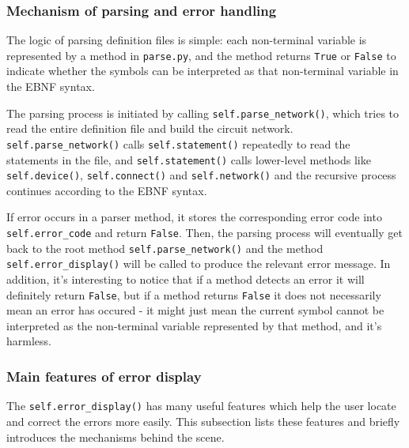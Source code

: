 \documentclass[10pt,a4paper]{article}
\begin{document}
\subsubsection{Mechanism of parsing and error handling}
\label{sec:org08be7c5}

The logic of parsing definition files is simple: each non-terminal
variable is represented by a method in \texttt{parse.py}, and the method
returns \texttt{True} or \texttt{False} to indicate whether the symbols can be
interpreted as that non-terminal variable in the EBNF syntax.

The parsing process is initiated by calling \texttt{self.parse\_network()},
which tries to read the entire definition file and build the circuit
network. \texttt{self.parse\_network()} calls \texttt{self.statement()} repeatedly to
read the statements in the file, and \texttt{self.statement()} calls
lower-level methods like \texttt{self.device()}, \texttt{self.connect()} and
\texttt{self.network()} and the recursive process continues according to the
EBNF syntax. 

If error occurs in a parser method, it stores the corresponding error
code into \texttt{self.error\_code} and return \texttt{False}. Then, the parsing
process will eventually get back to the root method
\texttt{self.parse\_network()} and the method \texttt{self.error\_display()} will be
called to produce the relevant error message. In addition, it's
interesting to notice that if a method detects an error it will
definitely return \texttt{False}, but if a method returns \texttt{False} it does not
necessarily mean an error has occured - it might just mean the current
symbol cannot be interpreted as the non-terminal variable represented
by that method, and it's harmless.

\subsubsection{Main features of error display}
\label{sec:orgf7b2cbd}

The \texttt{self.error\_display()} has many useful features which help the
user locate and correct the errors more easily. This subsection lists
these features and briefly introduces the mechanisms behind the scene.
\end{document}
